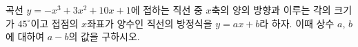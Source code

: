 곡선 $y=-x^3+3x^2+10x+1$에 접하는 직선 중 $x$축의 양의 방향과 이루는 각의 크기가 $45^\circ$이고 접점의 $x$좌표가 양수인 직선의 방정식을 $y=ax+b$라 하자. 이때 상수 $a$, $b$에 대하여 $a-b$의 값을 구하시오.
